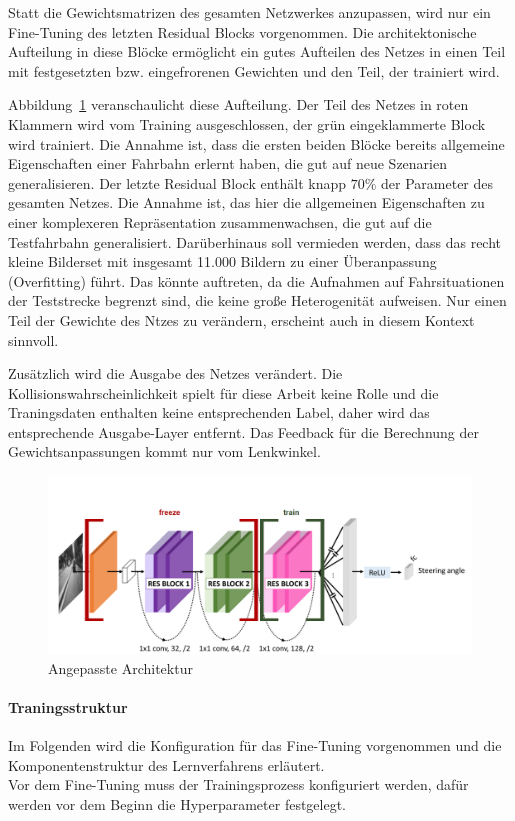 Statt die Gewichtsmatrizen des gesamten Netzwerkes anzupassen, wird nur ein Fine-Tuning des letzten Residual Blocks vorgenommen. Die architektonische Aufteilung in diese Blöcke ermöglicht ein gutes Aufteilen des Netzes in einen Teil mit festgesetzten bzw. eingefrorenen Gewichten und den Teil, der trainiert wird.

Abbildung~\ref{img:dronetfrozen} veranschaulicht diese Aufteilung. Der Teil des Netzes in roten Klammern wird vom Training ausgeschlossen, der grün eingeklammerte Block wird trainiert. Die Annahme ist, dass die ersten beiden Blöcke bereits allgemeine Eigenschaften einer Fahrbahn erlernt haben, die gut auf neue Szenarien generalisieren. Der letzte Residual Block enthält knapp $70\%$ der Parameter des gesamten Netzes. Die Annahme ist, das hier die allgemeinen Eigenschaften zu einer komplexeren Repräsentation zusammenwachsen, die gut auf die Testfahrbahn generalisiert. Darüberhinaus soll vermieden werden, dass das recht kleine Bilderset mit insgesamt 11.000 Bildern zu einer Überanpassung (Overfitting) führt. Das könnte auftreten, da die Aufnahmen auf Fahrsituationen der Teststrecke begrenzt sind, die keine große Heterogenität aufweisen. Nur einen Teil der Gewichte des Ntzes zu verändern, erscheint auch in diesem Kontext sinnvoll.

Zusätzlich wird die Ausgabe des Netzes verändert. Die Kollisionswahrscheinlichkeit spielt für diese Arbeit keine Rolle und die Traningsdaten enthalten keine entsprechenden Label, daher wird das entsprechende Ausgabe-Layer entfernt. Das Feedback für die Berechnung der Gewichtsanpassungen kommt nur vom Lenkwinkel.

\begin{figure}[h]
	\centering
	\includegraphics[scale=0.5]{figures/Architecture-DRONET-FROZEN.png}
	\caption{Angepasste Architektur}
	\label{img:dronetfrozen}
\end{figure}

\paragraph{Traningsstruktur}
Im Folgenden wird die Konfiguration für das Fine-Tuning vorgenommen und die Komponentenstruktur des Lernverfahrens erläutert.\\
Vor dem Fine-Tuning muss der Trainingsprozess konfiguriert werden, dafür werden vor dem Beginn die Hyperparameter festgelegt.

